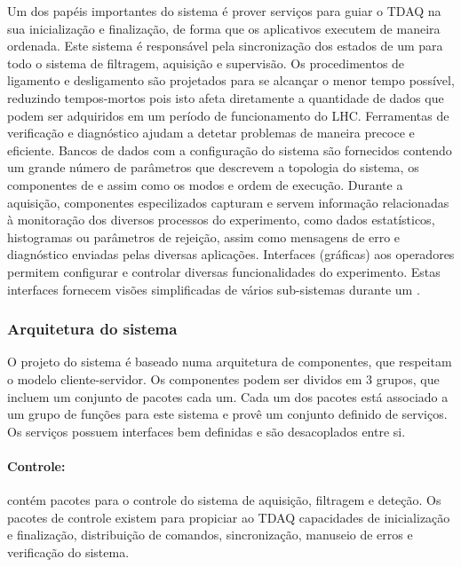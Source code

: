 Um dos papéis importantes do sistema  é prover serviços para guiar
o TDAQ na sua inicialização e finalização, de forma que os aplicativos
executem de maneira ordenada. Este sistema é responsável pela sincronização
dos estados de um  para todo o sistema de filtragem, aquisição e
supervisão. Os procedimentos de ligamento e desligamento são projetados para
se alcançar o menor tempo possível, reduzindo tempos-mortos pois isto afeta
diretamente a quantidade de dados que podem ser adquiridos em um período de
funcionamento do LHC. Ferramentas de verificação e diagnóstico ajudam a
detetar problemas de maneira precoce e eficiente. Bancos de dados com a
configuração do sistema são fornecidos contendo um grande número de parâmetros
que descrevem a topologia do sistema, os componentes de
 e  assim como os modos e ordem de
execução. Durante a aquisição, componentes especilizados capturam e servem
informação relacionadas à monitoração dos diversos processos do experimento,
como dados estatísticos, histogramas ou parâmetros de rejeição, assim como
mensagens de erro e diagnóstico enviadas pelas diversas aplicações. Interfaces
(gráficas) aos operadores permitem configurar e controlar diversas
funcionalidades do experimento. Estas interfaces fornecem visões simplificadas
de vários sub-sistemas durante um .

\subsubsection{Arquitetura do sistema }
\label{sec:online-arch}

O projeto do sistema  é baseado numa arquitetura de componentes,
que respeitam o modelo cliente-servidor. Os componentes podem ser dividos em 3
grupos, que incluem um conjunto de pacotes cada um. Cada um dos pacotes está
associado a um grupo de funções para este sistema e provê um conjunto definido
de serviços. Os serviços possuem interfaces bem definidas e são desacoplados
entre si.

\paragraph{Controle:} contém pacotes para o controle do sistema de
aquisição, filtragem e deteção. Os pacotes de controle existem para propiciar
ao TDAQ capacidades de inicialização e finalização, distribuição de comandos,
sincronização, manuseio de erros e verificação do sistema.

